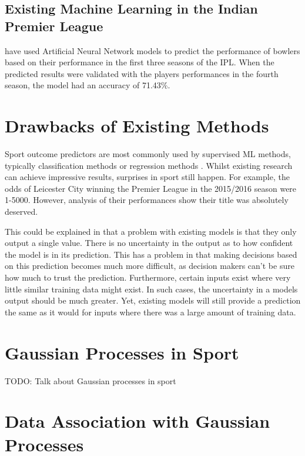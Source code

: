 \documentclass[12pt,a4paper]{report}
\begin{document}
\subsection{Existing Machine Learning in the Indian Premier League}

\citet{Saikia2012} have used Artificial Neural Network models to predict the performance of bowlers based on their performance in the first three seasons of the IPL. 
When the predicted results were validated with the players performances in the fourth season, the model had an accuracy of 71.43\%.

\section{Drawbacks of Existing Methods}

Sport outcome predictors are most commonly used by supervised ML methods, typically classification methods or regression methods \citep{horvat2020}. 
Whilst existing research can achieve impressive results, surprises in sport still happen. For example, the odds of Leicester City winning the Premier League in the 2015/2016 season were 1-5000. 
However, analysis of their performances show their title was absolutely deserved.

This could be explained in that a problem with existing models is that they only output a single value. 
There is no uncertainty in the output as to how confident the model is in its prediction. 
This has a problem in that making decisions based on this prediction becomes much more difficult, as decision makers can't be sure how much to trust the prediction. 
Furthermore, certain inputs exist where very little similar training data might exist. 
In such cases, the uncertainty in a models output should be much greater. 
Yet, existing models will still provide a prediction the same as it would for inputs where there was a large amount of training data.

\section{Gaussian Processes in Sport}

TODO: Talk about Gaussian processes in sport

\section{Data Association with Gaussian Processes}

\citep{Kaiser2018}
\citep{Lui2020}
\citep{Blumberg2020}
\end{document}
